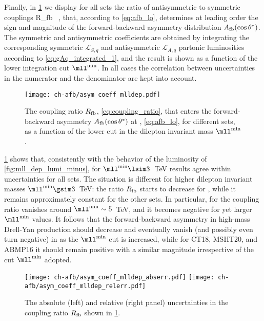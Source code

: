 Finally, in \cref{fig:asym_coeff_mlldep} we display for all
\pdf sets the
ratio of antisymmetric to symmetric couplings
\be
\label{eq:coupling_ratio}
R_{\rm fb}\equiv {} \, ,
\ee
that, according to
\cref{eq:afb_lo}, determines at leading order
the sign and magnitude
of the forward-backward asymmetry distribution $A_{\rm fb}(\cos\theta^*)$.
%
The symmetric and antisymmetric coefficients are obtained by integrating
the corresponding symmetric $\mathcal{L}_{S,q}$ and antisymmetric
$\mathcal{L}_{A,q}$ partonic luminosities according to
\cref{eq:gAq_integrated_1}, and the result is shown as a function of the lower integration cut $\mll^{\rm min}$.
%
In all cases the correlation between \pdf uncertainties in the numerator and
the denominator are kept into account.

\begin{figure}[!t]
 \centering
 \texttt{[image: ch-afb/asym\_coeff\_mlldep.pdf]}
 \caption{The coupling ratio $R_{\rm fb}$,
   \cref{eq:coupling_ratio},
   that enters the forward-backward asymmetry $A_{\rm
     fb}(\cos\theta^*)$ at \lo,  \cref{eq:afb_lo}, for different \pdf
   sets, as  a function of the lower cut in the dilepton
   invariant mass $\mll^{\rm min}$.
 }    
 \label{fig:asym_coeff_mlldep}
\end{figure}

\cref{fig:asym_coeff_mlldep} shows that, consistently
with the behavior of the luminosity of
\cref{fig:mll_dep_lumi_minus},  for $\mll^{{\rm
    min}}\lsim 3$~TeV results agree within uncertainties for all \pdf
sets.
%
The situation is different for higher dilepton invariant masses $\mll^{{\rm min}}\gsim 3$~TeV:
the ratio $R_{\rm fb}$ starts to decrease for , while it
remains approximately  constant 
for the other  \pdf sets. In particular, for  the coupling ratio
vanishes around $\mll^{{\rm min}}\sim5$~TeV, and it becomes negative
for yet larger   $\mll^{{\rm min}}$ values.
It follows that the forward-backward
asymmetry in high-mass Drell-Yan production should decrease  and
eventually vanish (and possibly even turn negative)
in  as the $\mll^{{\rm min}}$ cut is increased,
while for CT18, MSHT20, and ABMP16 it should remain positive
with a similar magnitude irrespective of the cut  $\mll^{{\rm min}}$ adopted.

\begin{figure}[!t]
 \centering
 \texttt{[image: ch-afb/asym\_coeff\_mlldep\_abserr.pdf]}
 \texttt{[image: ch-afb/asym\_coeff\_mlldep\_relerr.pdf]}
 \caption{The absolute (left) and relative (right panel) uncertainties
   in the coupling ratio $R_{\rm fb}$ shown in \cref{fig:asym_coeff_mlldep}.
 }    
 \label{fig:asym_coeff_mlldep_err}
\end{figure}

